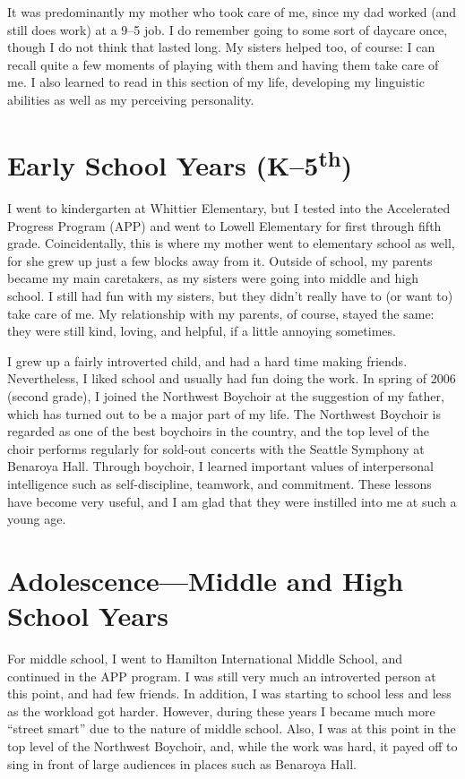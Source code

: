 \documentclass[12pt, letter]{article}
\renewcommand{\ss}[2]{#1\textsuperscript{#2}}
\begin{document}
	It was predominantly my mother who took care of me, since my dad worked (and still does work) at a 9--5 job. I do remember going to some sort of daycare once, though I do not think that lasted long. My sisters helped too, of course: I can recall quite a few moments of playing with them and having them take care of me. I also learned to read in this section of my life, developing my linguistic abilities as well as my perceiving personality.
	
	\singlespacing
	\section*{Early School Years (K--\ss{5}{th})}
	\doublespacing
	
	I went to kindergarten at Whittier Elementary, but I tested into the Accelerated Progress Program (APP) and went to Lowell Elementary for first through fifth grade. Coincidentally, this is where my mother went to elementary school as well, for she grew up just a few blocks away from it. Outside of school, my parents became my main caretakers, as my sisters were going into middle and high school. I still had fun with my sisters, but they didn't really have to (or want to) take care of me. My relationship with my parents, of course, stayed the same: they were still kind, loving, and helpful, if a little annoying sometimes.
	
	I grew up a fairly introverted child, and had a hard time making friends. Nevertheless, I liked school and usually had fun doing the work. In spring of 2006 (second grade), I joined the Northwest Boychoir at the suggestion of my father, which has turned out to be a major part of my life. The Northwest Boychoir is regarded as one of the best boychoirs in the country, and the top level of the choir performs regularly for sold-out concerts with the Seattle Symphony at Benaroya Hall. Through boychoir, I learned important values of interpersonal intelligence such as self-discipline, teamwork, and commitment. These lessons have become very useful, and I am glad that they were instilled into me at such a young age.
	
	\singlespacing
	\section*{Adolescence---Middle and High School Years}
	\doublespacing
	
	For middle school, I went to Hamilton International Middle School, and continued in the APP program. I was still very much an introverted person at this point, and had few friends. In addition, I was starting to school less and less as the workload got harder. However, during these years I became much more ``street smart'' due to the nature of middle school. Also, I was at this point in the top level of the Northwest Boychoir, and, while the work was hard, it payed off to sing in front of large audiences in places such as Benaroya Hall. 	
	
\end{document}

